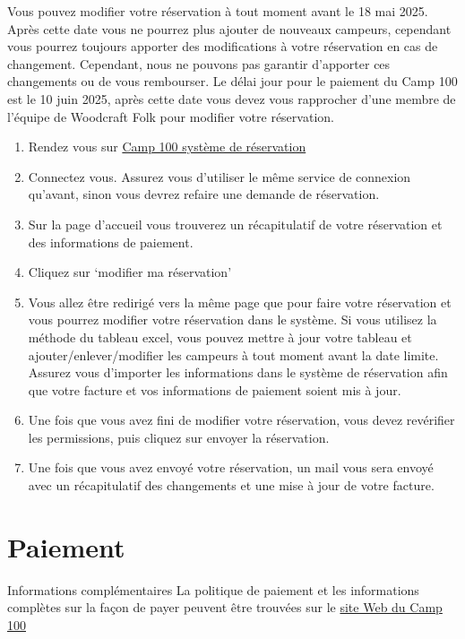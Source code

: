 \documentclass[a4paper, 11pt]{report}
\begin{document}
Vous pouvez modifier votre r\'eservation \`a tout moment avant le 18 mai 2025. Apr\`es cette date vous ne pourrez plus ajouter de nouveaux campeurs, cependant vous pourrez toujours apporter des modifications \`a votre r\'eservation en cas de changement. Cependant, nous ne pouvons pas garantir d'apporter ces changements ou de vous rembourser. Le d\'elai jour pour le paiement du Camp 100 est le 10 juin 2025, apr\`es cette date vous devez vous rapprocher d'une membre de l'\'equipe de Woodcraft Folk pour modifier votre r\'eservation.
\begin{enumerate}
    \item Rendez vous sur \href{https://bookings.camp100.org.ukj}{Camp 100 syst\`eme de r\'eservation}
    \item Connectez vous. Assurez vous d'utiliser le m\^eme service de connexion qu'avant, sinon vous devrez refaire une demande de r\'eservation. 
    \item Sur la page d'accueil vous trouverez un r\'ecapitulatif de votre r\'eservation et des informations de paiement.
    \item Cliquez sur `modifier ma r\'eservation'
    \item Vous allez \^etre redirig\'e vers la m\^eme page que pour faire votre r\'eservation et vous pourrez modifier votre r\'eservation dans le syst\`eme. Si vous utilisez la m\'ethode du tableau excel, vous pouvez mettre \`a jour votre tableau et ajouter/enlever/modifier les campeurs \`a tout moment avant la date limite. Assurez vous d'importer les informations dans le syst\`eme de r\'eservation afin que votre facture et vos informations de paiement soient mis \`a jour.
    \item Une fois que vous avez fini de modifier votre r\'eservation, vous devez rev\'erifier les permissions, puis cliquez sur envoyer la r\'eservation.
    \item Une fois que vous avez envoy\'e votre r\'eservation, un mail vous sera envoy\'e avec un r\'ecapitulatif des changements et une mise \`a jour de votre facture.
\end{enumerate}

\chapter{Paiement}
\label{chap:payment}

\begin{callout-orange}{Informations compl\'ementaires}
La politique de paiement et les informations compl\`etes sur la façon de payer peuvent \^etre trouv\'ees sur le \href{https://camp100.org.uk}{site Web du Camp 100}
\end{callout-orange}
\end{document}
